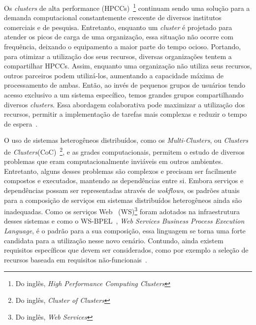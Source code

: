 \documentclass[12pt]{report} %
\begin{document}
    Os \textit{clusters} de alta performance (HPCCs)~\footnote{Do inglês, \textit{High Performance Computing Clusters}} continuam sendo uma solução para a demanda computacional constantemente crescente de diversos institutos comerciais e de pesquisa.
    Entretanto, enquanto um \textit{cluster} é projetado para atender os picos de carga de uma organização, essa situação não ocorre com frequência, deixando o equipamento a maior parte do tempo ocioso.
    Portando, para otimizar a utilização dos seus recursos, diversas organizações tentem a compartilhar HPCCs.
    Assim, enquanto uma organização não utiliza seus recursos, outros parceiros podem utilizá-los, aumentando a capacidade máxima de processamento de ambas.   
    Então, ao invés de pequenos grupos de usuários tendo acesso exclusivo a um sistema específico, temos grandes grupos compartilhando diversos \textit{clusters}.
    Essa abordagem colaborativa pode maximizar a utilização dos recursos, permitir a implementação de tarefas mais complexas e reduzir o tempo de espera~\cite{Bauer06}.
	
	
    O uso de sistemas heterogêneos distribuídos, como os \textit{Multi-Clusters}, ou \textit{Clusters} de \textit{Clusters}(CoC)~\footnote{Do inglês, \textit{Cluster of Clusters}}, e as grades computacionais, permitem o estudo de diversos problemas que eram computacionalmente inviáveis em outros ambientes.
    Entretanto, alguns desses problemas são complexos e precisam ser facilmente compostos e executados, mantendo as dependências entre si.
    Embora serviços e dependências possam ser representadas através de \textit{wokflows}, os padrões atuais para a composição de serviços em sistemas distribuídos heterogêneos ainda são inadequadas.
    Como os serviços Web~\cite{alonso2004} (WS)\footnote{Do inglês, \textit{Web Services}} foram adotados na infraestrutura desses sistemas e como o WS-BPEL~\cite{bpel:website}, \textit{Web Services Business Process Execution Language}, é o padrão para a sua composição, essa linguagem se torna uma forte candidata para a utilização nesse novo cenário.
    Contundo, ainda existem requisitos específicos que devem ser considerados, como por exemplo a seleção de recursos baseada em requisitos não-funcionais~\cite{FOX06}.
\end{document}
